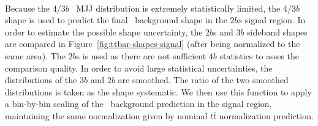 
\paragraph{}
Because the 4/3$b$ \ttbar\ MJJ distribution is extremely statistically limited, the 4/3$b$ shape is used to predict the final \ttbar\ background shape in the $2bs$ signal region. In order to estimate the possible shape uncertainty, the $2b$s and $3b$ sideband shapes are compared in Figure~\ref{fig:ttbar-shapes-signal} (after being normalized to the same area).  The $2b$s is used as there are not sufficient $4b$ statistics to asses the comparison quality. In order to avoid large statistical uncertainties, the distributions of the $3b$ and $2b$ are smoothed. The ratio of the two smoothed distributions is taken as the shape systematic. We then use this function to apply a bin-by-bin scaling of the \ttbar\ background prediction in the signal region, maintaining the same normalization given by nominal $t\bar{t}$ normalization prediction.

